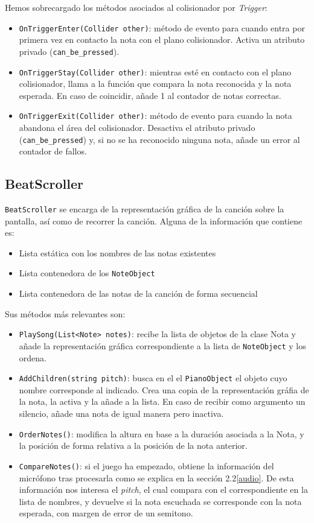 Hemos sobrecargado los métodos asociados al colisionador por \textit{Trigger}:
\begin{itemize}
	\item \texttt{OnTriggerEnter(Collider other)}: método de evento para cuando entra por primera vez en contacto la nota
	con el plano colisionador. Activa un atributo privado (\texttt{can\_be\_pressed}).
	\item \texttt{OnTriggerStay(Collider other)}: mientras esté en contacto con el plano colisionador,
	llama a la función que compara la nota reconocida y la nota esperada. En
	caso de coincidir, añade 1 al contador de notas correctas.
	\item \texttt{OnTriggerExit(Collider other)}: método de evento para cuando la nota abandona el área del colisionador. 
	Desactiva el atributo privado (\texttt{can\_be\_pressed}) y, si no se ha reconocido ninguna nota, añade un error al contador de fallos.
\end{itemize}

\subsection{BeatScroller}
\texttt{BeatScroller} se encarga de la representación gráfica de la canción sobre la pantalla, así como de recorrer la canción.
Alguna de la información que contiene es:
\begin{itemize}
	\item Lista estática con los nombres de las notas existentes 
	\item Lista contenedora de los \texttt{NoteObject}
	\item Lista contenedora de las notas de la canción de forma secuencial
\end{itemize}

Sus métodos más relevantes son:
\begin{itemize} 
	\item \texttt{PlaySong(List<Note> notes)}: recibe la lista de objetos de la clase Nota y añade la representación gráfica
	correspondiente a la lista de \texttt{NoteObject} y los ordena.
	\item \texttt{AddChildren(string pitch)}: busca en el el \texttt{PianoObject} el objeto cuyo nombre corresponde al indicado.
	Crea una copia de la representación gráfia de la nota, la activa y la añade a la lista. En caso de recibir como argumento un 
	silencio, añade una nota de igual manera pero inactiva.
	\item \texttt{OrderNotes()}: modifica la altura en base a la duración asociada a la Nota, y la posición de forma relativa a la
	posición de la nota anterior.
	\item \texttt{CompareNotes()}: si el juego ha empezado, obtiene la información del micrófono tras procesarla como se explica 
	en la sección 2.2\ref{audio}. De esta información nos interesa el \textit{pitch}, el cual compara con el correspondiente
	en la lista de nombres, y devuelve si la nota escuchada se corresponde con la nota esperada, con margen de error de un semitono.
\end{itemize}

